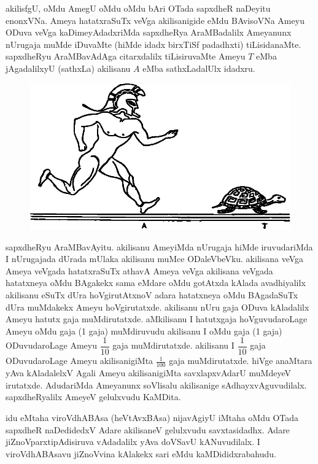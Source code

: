 akilisfgU, oMdu AmegU oMdu oMdu bAri OTada sapxdheR naDeyitu enonxVNa. Ameya hatatxraSuTx veVga akilisanigide eMdu BAvisoVNa Ameyu ODuva veVga kaDimeyAdadxriMda sapxdheRya AraMBadalilx Ameyanunx nUrugaja muMde iDuvaMte (hiMde idadx birxTiSf padadhxti) tiLisidanaMte. sapxdheRyu AraMBavAdAga citarxdalilx tiLisiruvaMte Ameyu $T$ eMba jAgadalilxyU (sathxLa) akilisanu $A$ eMba sathxLadalUlx idadxru. 
\begin{figure}[H]
\centering
\includegraphics[scale=.8]{src/figures/m_085.eps}
\end{figure}


sapxdheRyu AraMBavAyitu. akilisanu AmeyiMda nUrugaja hiMde iruvudariMda I nUrugajada dUrada mUlaka akilisanu muMce ODaleVbeVku. akilisana veVga Ameya veVgada hatatxraSuTx athavA Ameya veVga akilisana veVgada hatatxneya oMdu BAgakekx sama eMdare oMdu gotAtxda kAlada avadhiyalilx akilisanu eSuTx dUra hoVgirutAtxnoV adara hatatxneya oMdu BAgadaSuTx dUra muMdakekx Ameyu hoVgirutatxde. akilisanu nUru gaja ODuva kAladalilx Ameyu hatutx gaja muMdirutatxde. aMkilisanu I hatutxgaja hoVguvudaroLage Ameyu oMdu gaja ({\rm 1} gaja) muMdiruvudu akilisanu I oMdu gaja ({\rm 1} gaja) ODuvudaroLage Ameyu $\dfrac{1}{10}$ gaja muMdirutatxde. akilisanu I $\dfrac{1}{10}$ gaja ODuvudaroLage Ameyu akilisanigiMta $\frac{1}{100}$ gaja muMdirutatxde. hiVge anaMtara yAva kAladalelxV Agali Ameyu akilisanigiMta savxlapxvAdarU muMdeyeV irutatxde. AdudariMda Ameyanunx soVlisalu akilisanige sAdhayxvAguvudilalx. sapxdheRyalilx AmeyeV gelulxvudu KaMDita.

idu eMtaha viroVdhABAsa (heVtAvxBAsa) nijavAgiyU iMtaha oMdu OTada sapxdheR naDedidedxV Adare akilisaneV gelulxvudu savxtasidadhx. Adare jiZnoVparxtipAdisiruva vAdadalilx yAva doVSavU kANuvudilalx. I viroVdhABAsavu  jiZnoVvina kAlakekx sari eMdu kaMDididxrabahudu.

